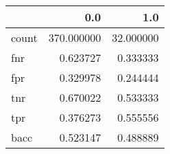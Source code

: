 \begin{tabular}{lrr}
\toprule
{} &         0.0 &        1.0 \\
\midrule
count &  370.000000 &  32.000000 \\
fnr   &    0.623727 &   0.333333 \\
fpr   &    0.329978 &   0.244444 \\
tnr   &    0.670022 &   0.533333 \\
tpr   &    0.376273 &   0.555556 \\
bacc  &    0.523147 &   0.488889 \\
\bottomrule
\end{tabular}
